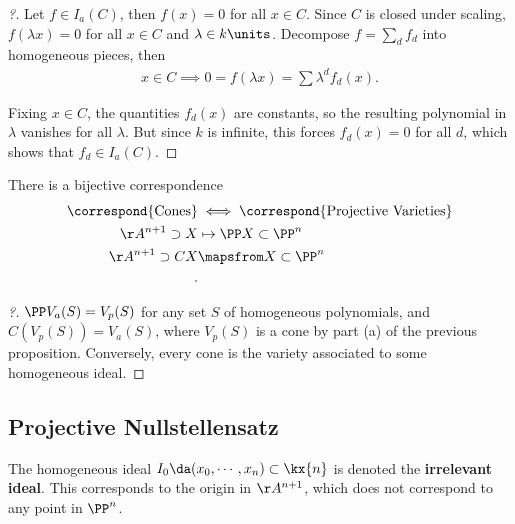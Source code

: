 \begin{proof}[?]

Let \(f\in I_a(C)\), then \(f(x) = 0\) for all \(x\in C\). Since \(C\)
is closed under scaling, \(f(\lambda x) = 0\) for all \(x\in C\) and
\(\lambda \in k\units\). Decompose \(f = \sum_d f_d\) into homogeneous
pieces, then
\begin{align*}  
x\in C \implies 0 = f(\lambda x) = \sum \lambda^d f_d(x) 
.\end{align*}

Fixing \(x\in C\), the quantities \(f_d(x)\) are constants, so the
resulting polynomial in \(\lambda\) vanishes for all \(\lambda\). But
since \(k\) is infinite, this forces \(f_d(x) = 0\) for all \(d\), which
shows that \(f_d \in I_a(C)\).

\end{proof}

\begin{lemma}[?]

There is a bijective correspondence
\begin{align*}  
\correspond{\text{Cones}} 
&\iff
\correspond{\text{Projective Varieties}} \\
\AA^{n+1} \supset X &\mapsto \PP X\subset \PP^n \\
\AA^{n+1} \supset CX &\mapsfrom X\subset \PP^n \\
.\end{align*}

\end{lemma}

\begin{proof}[?]

\(\PP V_a(S) = V_p(S)\) for any set \(S\) of homogeneous polynomials,
and \(C(V_p(S)) = V_a(S)\), where \(V_p(S)\) is a cone by part (a) of
the previous proposition. Conversely, every cone is the variety
associated to some homogeneous ideal.

\end{proof}

\hypertarget{projective-nullstellensatz-1}{%
\subsection{Projective
Nullstellensatz}\label{projective-nullstellensatz-1}}

\begin{definition}

The homogeneous ideal \(I_0 \da (x_0, \cdots, x_n) \subset \kx{n}\) is
denoted the \textbf{irrelevant ideal}. This corresponds to the origin in
\(\AA^{n+1}\), which does not correspond to any point in \(\PP^n\).

\end{definition}

